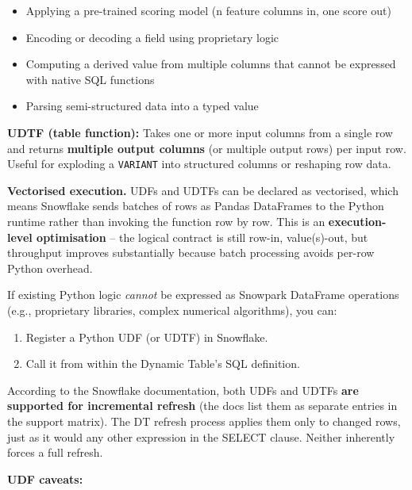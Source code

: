 \documentclass[
  letterpaper,
  DIV=11,
  numbers=noendperiod]{scrreprt}
\providecommand{\tightlist}{%
  \setlength{\itemsep}{0pt}\setlength{\parskip}{0pt}}\usepackage{longtable,booktabs,array}
\begin{document}
\begin{itemize}
\tightlist
\item
  Applying a pre-trained scoring model (n feature columns in, one score
  out)
\item
  Encoding or decoding a field using proprietary logic
\item
  Computing a derived value from multiple columns that cannot be
  expressed with native SQL functions
\item
  Parsing semi-structured data into a typed value
\end{itemize}

\textbf{UDTF (table function):} Takes one or more input columns from a
single row and returns \textbf{multiple output columns} (or multiple
output rows) per input row. Useful for exploding a \texttt{VARIANT} into
structured columns or reshaping row data.

\textbf{Vectorised execution.} UDFs and UDTFs can be declared as
vectorised, which means Snowflake sends batches of rows as Pandas
DataFrames to the Python runtime rather than invoking the function row
by row. This is an \textbf{execution-level optimisation} -- the logical
contract is still row-in, value(s)-out, but throughput improves
substantially because batch processing avoids per-row Python overhead.

If existing Python logic \emph{cannot} be expressed as Snowpark
DataFrame operations (e.g., proprietary libraries, complex numerical
algorithms), you can:

\begin{enumerate}
\def\labelenumi{\arabic{enumi}.}
\tightlist
\item
  Register a Python UDF (or UDTF) in Snowflake.
\item
  Call it from within the Dynamic Table's SQL definition.
\end{enumerate}

According to the Snowflake documentation, both UDFs and UDTFs
\textbf{are supported for incremental refresh} (the docs list them as
separate entries in the support matrix). The DT refresh process applies
them only to changed rows, just as it would any other expression in the
SELECT clause. Neither inherently forces a full refresh.

\textbf{UDF caveats:}
\end{document}
